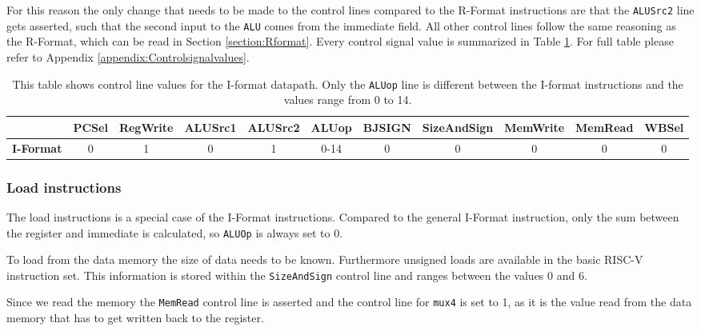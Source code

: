         For this reason the only change that needs to be made to the control lines compared to the R-Format instructions are that the \texttt{ALUSrc2} line gets asserted, such that the second input to the \texttt{ALU} comes from the immediate field. All other control lines follow the same reasoning as the R-Format, which can be read in Section \ref{section:Rformat}. Every control signal value is summarized in Table \ref{table:IFORMAT}. For full table please refer to Appendix \ref{appendix:Controlsignalvalues}.
        
        \begin{table}[h!]
            \small
            \hspace{-2.4cm}
            \begin{tabular}{|c||c|c|c|c|c|c|c|c|c|c|}
            	\hline
            	                  & \textbf{PCSel} & \textbf{RegWrite} & \textbf{ALUSrc1} & \textbf{ALUSrc2} & \textbf{ALUop} & \textbf{BJSIGN} & \textbf{SizeAndSign} & \textbf{MemWrite} & \textbf{MemRead} & \textbf{WBSel} \\ \hline\hline
            	\textbf{I-Format} &       0        &         1         &        0         &        1         &      0-14      &        0        &          0           &         0         &        0         &       0        \\ \hline
            \end{tabular}
            \caption{This table shows control line values for the I-format datapath. Only the \texttt{ALUop} line is different between the I-format instructions and the values range from 0 to 14.}
            \label{table:IFORMAT}
        \end{table}
    
        \subsubsection{Load instructions}
            The load instructions is a special case of the I-Format instructions. Compared to the general I-Format instruction, only the sum between the register and immediate is calculated, so \texttt{ALUOp} is always set to 0.
            
            To load from the data memory the size of data needs to be known. Furthermore unsigned loads are available in the basic RISC-V instruction set. This information is stored within the \texttt{SizeAndSign} control line and ranges between the values 0 and 6.
            
            Since we read the memory the \texttt{MemRead} control line is asserted and the control line for \texttt{mux4} is set to 1, as it is the value read from the data memory that has to get written back to the register.
            
